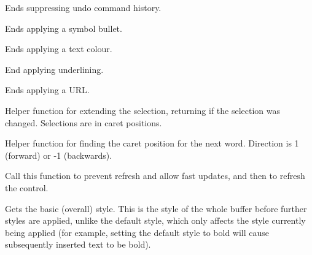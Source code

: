 
Ends suppressing undo command history.

\label{wxrichtextctrlendsymbolbullet}


Ends applying a symbol bullet.

\label{wxrichtextctrlendtextcolour}


Ends applying a text colour.

\label{wxrichtextctrlendunderline}


End applying underlining.

\label{wxrichtextctrlendurl}


Ends applying a URL.

\label{wxrichtextctrlextendselection}


Helper function for extending the selection, returning \true if the selection was
changed. Selections are in caret positions.

\label{wxrichtextctrlfindnextwordposition}


Helper function for finding the caret position for the next word. Direction
is 1 (forward) or -1 (backwards).

\label{wxrichtextctrlfreeze}


Call this function to prevent refresh and allow fast updates, and then  to
refresh the control.

\label{wxrichtextctrlgetbasicstyle}


Gets the basic (overall) style. This is the style of the whole
buffer before further styles are applied, unlike the default style, which
only affects the style currently being applied (for example, setting the default
style to bold will cause subsequently inserted text to be bold).

